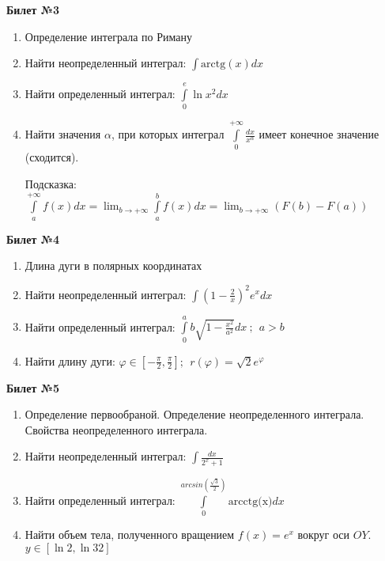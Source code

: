 \documentclass[a4paper, 12pt]{article}
\begin{document}
\begin{center}
	\textbf{Билет №3}
\end{center}
\begin{enumerate}
	\item Определение интеграла по Риману
	\item Найти неопределенный интеграл: $\displaystyle \int{\text{arctg}(x)dx}$
	\item Найти определенный интеграл: $\displaystyle \int\limits_{0}^{e}{\ln{x^2}dx}$
	\item Найти значения $\alpha$, при которых интеграл $\displaystyle \int\limits_{0}^{+\infty}{\frac{dx}{x^{\alpha}}}$ имеет конечное значение (сходится).
	
	Подсказка: $\displaystyle \int\limits_{a}^{+\infty}{f(x)dx} = \lim_{b\to+\infty}{\int\limits_{a}^{b}{f(x)dx}} = \lim_{b\to+\infty}{\left(F(b) - F(a)\right)} $
	
\end{enumerate}
\newpage
\begin{center}
	\textbf{Билет №4}
\end{center}
\begin{enumerate}
	\item Длина дуги в полярных координатах
	\item Найти неопределенный интеграл: $\displaystyle \int{\left(1-\frac{2}{x}\right)^2 e^xdx}$
	\item Найти определенный интеграл: $\displaystyle \int\limits_{0}^{a}{b\sqrt{1 - \frac{x^2}{a^2}}dx} \ ; \ \ a > b$
	\item Найти длину дуги: $\displaystyle \varphi \in \left[-\frac{\pi}{2}, \frac{\pi}{2}\right];\ \  r(\varphi) = \displaystyle \sqrt{2}e^{\varphi}$
	
\end{enumerate}

\begin{center}
	\textbf{Билет №5}
\end{center}
\begin{enumerate}
	\item Определение первообраной. Определение неопределенного интеграла. Свойства неопределенного интеграла.
	\item Найти неопределенный интеграл: $\displaystyle \int{\frac{dx}{2^x + 1}}$
	\item Найти определенный интеграл: $\displaystyle \int\limits_{0}^{arcsin(\frac{\sqrt{3}}{2})}{\text{arcctg(x)}dx}$
	\item Найти объем тела, полученного вращением $\displaystyle f(x) = e^x$ вокруг оси $OY$. $\displaystyle y \in \left[\ln{2},\ln{32}\right]$ 
\end{enumerate}
\end{document}
